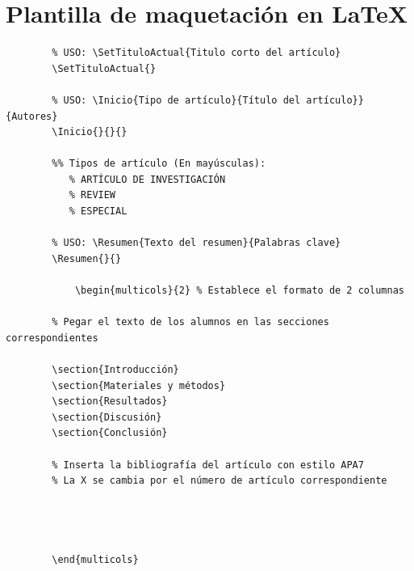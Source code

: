 \documentclass{Manual}
\begin{document}
    \frontmatter

\Portada
\Indices



    \mainmatter



% 




    
    
    \appendix
    
\chapter{Plantilla de maquetación en LaTeX}\label{sec:plantilla_de_maquetación}
    \begin{verbatim}
        % USO: \SetTituloActual{Titulo corto del artículo}
        \SetTituloActual{}

        % USO: \Inicio{Tipo de artículo}{Título del artículo}}{Autores}   
        \Inicio{}{}{}

        %% Tipos de artículo (En mayúsculas):
           % ARTÍCULO DE INVESTIGACIÓN
           % REVIEW
           % ESPECIAL

        % USO: \Resumen{Texto del resumen}{Palabras clave}
        \Resumen{}{}

            \begin{multicols}{2} % Establece el formato de 2 columnas
            
        % Pegar el texto de los alumnos en las secciones correspondientes
        
        \section{Introducción}
        \section{Materiales y métodos}
        \section{Resultados}
        \section{Discusión}
        \section{Conclusión}

        % Inserta la bibliografía del artículo con estilo APA7
        % La X se cambia por el número de artículo correspondiente
        
        
        

        \end{multicols}
    \end{verbatim}
\end{document}
